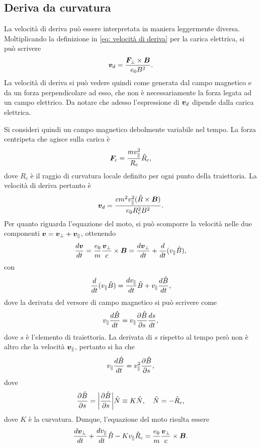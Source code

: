 \subsection{Deriva da curvatura}
La velocità di deriva può essere interpretata in maniera leggermente diversa. Moltiplicando la definizione in \eqref{eq: velocità di deriva} per la carica elettrica, si può scrivere
\begin{equation}
    \bm{v}_d = \frac{\bm{F}_\perp \times \bm{B}}{e_0B^2}.
\end{equation}
La velocità di deriva si può vedere quindi come generata dal campo magnetico e da un forza perpendicolare ad esso, che non è necessariamente la forza legata ad un campo elettrico. Da notare che adesso l'espressione di $\bm{v}_d$ dipende dalla carica elettrica. 

Si consideri quindi un campo magnetico debolmente variabile nel tempo. La forza centripeta che agisce sulla carica è
\begin{equation}
    \bm{F}_c = \frac{mv_\parallel^2}{R_c}\hat{R}_c,
\end{equation}
dove $R_c$ è il raggio di curvatura locale definito per ogni punto della traiettoria. La velocità di deriva pertanto è
\begin{equation}
    \bm{v}_d = \frac{cm^2v_\parallel^2(\hat{R} \times \bm{B})}{e_0R_c^2B^2}.
\end{equation}
Per quanto riguarda l'equazione del moto, si può scomporre la velocità nelle due componenti $\bm{v} = \bm{v}_\perp + \bm{v}_\parallel$, ottenendo
\begin{equation}
    \frac{d\bm{v}}{dt} = \frac{e_0}{m}\frac{\bm{v}_\perp}{c} \times \bm{B} = \frac{d\bm{v}_\perp}{dt} + \frac{d}{dt}(v_\parallel\hat{B}),
\end{equation}
con 
\begin{equation}
    \frac{d}{dt}(v_\parallel\hat{B}) = \frac{dv_\parallel}{dt}\hat{B} + v_\parallel\frac{d\hat{B}}{dt},
\end{equation}
dove la derivata del versore di campo magnetico si può scrivere come
\begin{equation}
    v_\parallel\frac{d\hat{B}}{dt} = v_\parallel\frac{\partial\hat{B}}{\partial s}\frac{ds}{dt},
\end{equation}
dove $s$ è l'elemento di traiettoria. La derivata di $s$ rispetto al tempo però non è altro che la velocità $\bm{v}_\parallel$, pertanto si ha che 
\begin{equation}
    v_\parallel\frac{d\hat{B}}{dt} = v_\parallel^2\frac{\partial\hat{B}}{\partial s},
\end{equation}
dove 
\begin{equation}
    \frac{\partial\hat{B}}{\partial s} = \bigg|\frac{\partial\hat{B}}{\partial s}\bigg|\hat{N} \equiv K\hat{N},\quad \hat{N} = -\hat{R}_c,
\end{equation}
dove $K$ è la curvatura. Dunque, l'equazione del moto risulta essere
\begin{equation}
    \frac{d\bm{v}_\perp}{dt} + \frac{dv_\parallel}{dt}\hat{B} - Kv_\parallel\hat{R}_c = \frac{e_0}{m}\frac{\bm{v}_\perp}{c} \times \bm{B}.
\end{equation}

